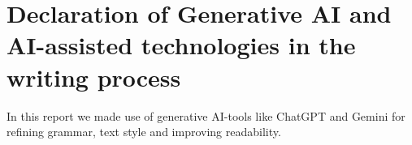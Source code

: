 \newpage
\section*{Declaration of Generative AI and AI-assisted technologies in the writing process}

In this report we made use of generative AI-tools like ChatGPT and Gemini for refining grammar, text style and improving readability.